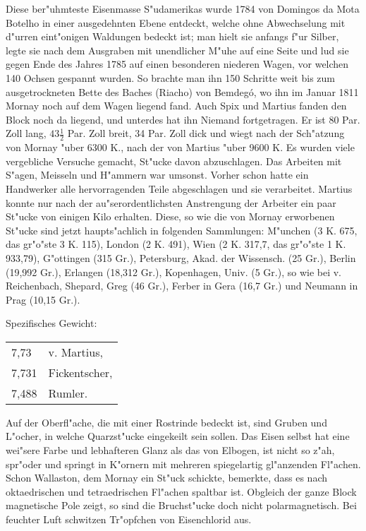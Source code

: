 \documentclass[a4paper, 11pt, oneside]{article}
\begin{document}
Diese ber"uhmteste Eisenmasse S"udamerikas wurde 1784 von Domingos da Mota Botelho in einer ausgedehnten Ebene entdeckt, welche ohne Abwechselung mit d"urren eint"onigen Waldungen bedeckt ist; man hielt sie anfangs f"ur Silber, legte sie nach dem Ausgraben mit unendlicher M"uhe auf eine Seite und lud sie gegen Ende des Jahres 1785 auf einen besonderen niederen Wagen, vor welchen 140 Ochsen gespannt wurden. So brachte man ihn 150 Schritte weit bis zum ausgetrockneten Bette des Baches (Riacho) von Bemdegó, wo ihn im Januar 1811 Mornay noch auf dem Wagen liegend fand. Auch Spix und Martius fanden den Block noch da liegend, und unterdes hat ihn Niemand fortgetragen. Er ist 80 Par. Zoll lang, $43\frac{1}{2}$ Par. Zoll breit, 34 Par. Zoll dick und wiegt nach der Sch"atzung von Mornay "uber 6300 K., nach der von Martius "uber 9600 K. Es wurden viele vergebliche Versuche gemacht, St"ucke davon abzuschlagen. Das Arbeiten mit S"agen, Meisseln und H"ammern war umsonst. Vorher schon hatte ein Handwerker alle hervorragenden Teile abgeschlagen und sie verarbeitet. Martius konnte nur nach der au"serordentlichsten Anstrengung der Arbeiter ein paar St"ucke von einigen Kilo erhalten. Diese, so wie die von Mornay erworbenen St"ucke sind jetzt haupts"achlich in folgenden Sammlungen: M"unchen (3 K. 675, das gr"o"ste 3 K. 115), London (2 K. 491), Wien (2 K. 317,7, das gr"o"ste 1 K. 933,79), G"ottingen (315 Gr.), Petersburg, Akad. der Wissensch. (25 Gr.), Berlin (19,992 Gr.), Erlangen (18,312 Gr.), Kopenhagen, Univ. (5 Gr.), so wie bei v. Reichenbach, Shepard, Greg (46 Gr.), Ferber in Gera (16,7 Gr.) und Neumann in Prag (10,15 Gr.).

Spezifisches Gewicht:  
\begin{table}[!ht]
    \centering\swabfamily\Large
    \begin{tabular}{l l}
        7,73 & v. Martius,\\
        7,731 & Fickentscher,\\
        7,488 & Rumler.
    \end{tabular}
\end{table}

Auf der Oberfl"ache, die mit einer Rostrinde bedeckt ist, sind Gruben und L"ocher, in welche Quarzst"ucke eingekeilt sein sollen. Das Eisen selbst hat eine wei"sere Farbe und lebhafteren Glanz als das von Elbogen, ist nicht so z"ah, spr"oder und springt in K"ornern mit mehreren spiegelartig gl"anzenden Fl"achen. Schon Wallaston, dem Mornay ein St"uck schickte, bemerkte, dass es nach oktaedrischen und tetraedrischen Fl"achen spaltbar ist. Obgleich der ganze Block magnetische Pole zeigt, so sind die Bruchst"ucke doch nicht polarmagnetisch. Bei feuchter Luft schwitzen Tr"opfchen von Eisenchlorid aus.
\end{document}
